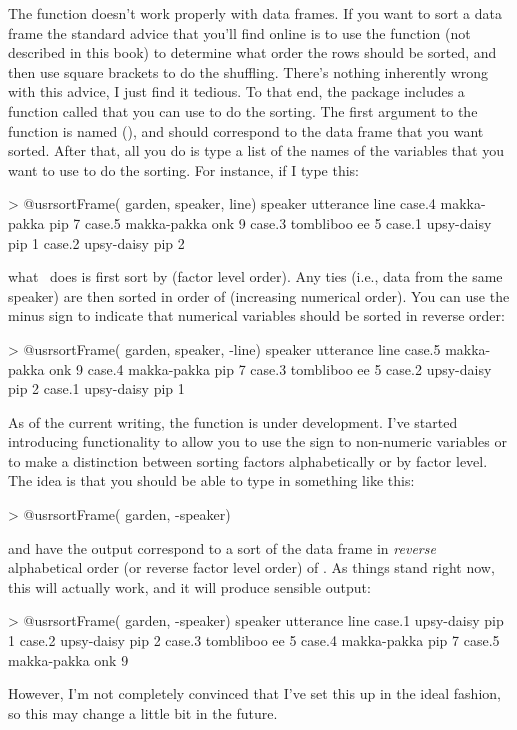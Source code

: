 The  function doesn't work properly with data frames. If you want to sort a data frame the standard advice that you'll find online is to use the  function (not described in this book) to determine what order the rows should be sorted, and then use square brackets to do the shuffling. There's nothing inherently wrong with this advice, I just find it tedious. To that end, the  package includes a function called  that you can use to do the sorting. The first argument to the function is named (), and should correspond to the data frame that you want sorted. After that, all you do is type a list of the names of the variables that you want to use to do the sorting. For instance, if I type this:
\begin{rblock1}
> @usr{sortFrame( garden, speaker, line)}
           speaker utterance line
case.4 makka-pakka       pip    7
case.5 makka-pakka       onk    9
case.3   tombliboo        ee    5
case.1  upsy-daisy       pip    1
case.2  upsy-daisy       pip    2
\end{rblock1}
what \R\ does is first sort by  (factor level order). Any ties (i.e., data from the same speaker) are then sorted in order of  (increasing numerical order). You can use the minus sign to indicate that numerical variables should be sorted in reverse order:
\begin{rblock1}
> @usr{sortFrame( garden, speaker, -line)}
           speaker utterance line
case.5 makka-pakka       onk    9
case.4 makka-pakka       pip    7
case.3   tombliboo        ee    5
case.2  upsy-daisy       pip    2
case.1  upsy-daisy       pip    1
\end{rblock1}
As of the current writing, the  function is under development. I've started introducing functionality to allow you to use the \rtext{-} sign to non-numeric variables or to make a distinction between sorting factors alphabetically or by factor level. The idea is that you should be able to type in something like this: 
\begin{rblock1}
> @usr{sortFrame( garden, -speaker)}
\end{rblock1}
and have the output correspond to a sort of the  data frame in {\it reverse} alphabetical order (or reverse factor level order) of . As things stand right now, this will actually work, and it will produce sensible output:
\begin{rblock1}
> @usr{sortFrame( garden, -speaker)}
           speaker utterance line
case.1  upsy-daisy       pip    1
case.2  upsy-daisy       pip    2
case.3   tombliboo        ee    5
case.4 makka-pakka       pip    7
case.5 makka-pakka       onk    9
\end{rblock1}
However, I'm not completely convinced that I've set this up in the ideal fashion, so this may change a little bit in the future.

